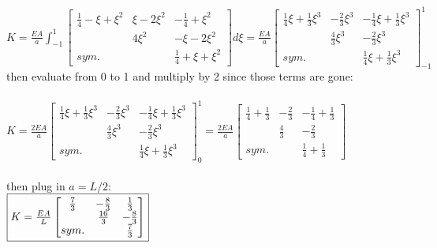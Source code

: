 \documentclass{article}
\begin{document}
$K=\frac{EA}{a}\int_{-1}^{1}\begin{bmatrix}
    \frac{1}{4}-\xi+\xi^2 & \xi-2\xi^2 & -\frac{1}{4}+\xi^2 \\
    & 4\xi^2 & -\xi-2\xi^2 \\
    sym. & & \frac{1}{4}+\xi+\xi^2
\end{bmatrix} d\xi=\frac{EA}{a}\begin{bmatrix}
    \frac{1}{4}\xi+\frac{1}{3}\xi^3 & -\frac{2}{3}\xi^3 & -\frac{1}{4}\xi+\frac{1}{3}\xi^3 \\
    & \frac{4}{3}\xi^3 & -\frac{2}{3}\xi^3 \\
    sym. & & \frac{1}{4}\xi+\frac{1}{3}\xi^3
\end{bmatrix}_{-1}^1$ \\
then evaluate from 0 to 1 and multiply by 2 since those terms are gone: \\\\
$K=\frac{2EA}{a}\begin{bmatrix}
    \frac{1}{4}\xi+\frac{1}{3}\xi^3 & -\frac{2}{3}\xi^3 & -\frac{1}{4}\xi+\frac{1}{3}\xi^3 \\
    & \frac{4}{3}\xi^3 & -\frac{2}{3}\xi^3 \\
    sym. & & \frac{1}{4}\xi+\frac{1}{3}\xi^3
\end{bmatrix}_{0}^1=\frac{2EA}{a}\begin{bmatrix}
    \frac{1}{4}+\frac{1}{3} & -\frac{2}{3} & -\frac{1}{4}+\frac{1}{3} \\
    & \frac{4}{3} & -\frac{2}{3} \\
    sym. & & \frac{1}{4}+\frac{1}{3}
\end{bmatrix}$ \\\\
then plug in $a=L/2$: \\
$\fbox{$K=\frac{EA}{L}\begin{bmatrix}
    \frac{7}{3} & -\frac{8}{3} & \frac{1}{3} \\
    & \frac{16}{3} & -\frac{8}{3} \\
    sym. & & \frac{7}{3}
\end{bmatrix}$}$
\end{document}
